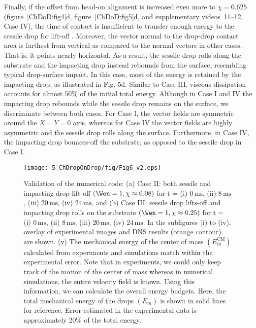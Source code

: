 Finally, if the offset from head-on alignment is increased even more to $\chi = 0.625$ (figure~\ref{ChDoD:fig4}d, figure~\ref{ChDoD:fig5}d, and supplementary videos~{\color{Myfig}11--12}, Case IV), the time of contact is insufficient to transfer enough energy to the sessile drop for lift-off \cite{andrew2017}. Moreover, the vector normal to the drop-drop contact area is farthest from vertical as compared to the normal vectors in other cases. That is, it points nearly horizontal. As a result, the sessile drop rolls along the substrate and the impacting drop instead rebounds from the surface, resembling typical drop-surface impact. In this case, most of the energy is retained by the impacting drop, as illustrated in Fig. 5d. Similar to Case III, viscous dissipation accounts for almost 50\% of the initial total energy. Although in Case I and IV the impacting drop rebounds while the sessile drop remains on the surface, we discriminate between both cases. For Case I, the vector fields are symmetric around the $X = Y = 0$ axis, whereas for Case IV the vector fields are highly asymmetric and the sessile drop rolls along the surface. Furthermore, in Case IV, the impacting drop bounces-off the substrate, as opposed to the sessile drop in Case I. 

\begin{figure}
	\centering
	\texttt{[image: 5\_ChDropOnDrop/fig/Fig6\_v2.eps]}
	\caption{Validation of the numerical code: (a) Case II: both sessile and impacting drop lift-off $\left(\Wen = 1, \chi \approx 0.08\right)$ for t = (i) $0\,\si{\milli\second}$, (ii) $8\,\si{\milli\second}$, (iii) $20\,\si{\milli\second}$, (iv) $24\,\si{\milli\second}$, and (b) Case III: sessile drop lifts-off and impacting drop rolls on the substrate $\left(\Wen = 1, \chi \approx 0.25\right)$ for t = (i) $0\,\si{\milli\second}$, (ii) $8\,\si{\milli\second}$, (iii) $20\,\si{\milli\second}$, (iv) $24\,\si{\milli\second}$. In the subfigures (i) to (iv), overlay of experimental images and DNS results (orange contour) are shown. (v) The mechanical energy of the center of mass $\left(E_m^{\text{CM}}\right)$ calculated from experiments and simulations match within the experimental error. Note that in experiments, we could only keep track of the motion of the center of mass whereas in numerical simulations, the entire velocity field is known. Using this information, we can calculate the overall energy budgets. Here, the total mechanical energy of the drops $\left(E_m\right)$ is shown in solid lines for reference. Error estimated in the experimental data is approximately 20\% of the total energy.}
	\label{ChDoD:fig6}
\end{figure}

